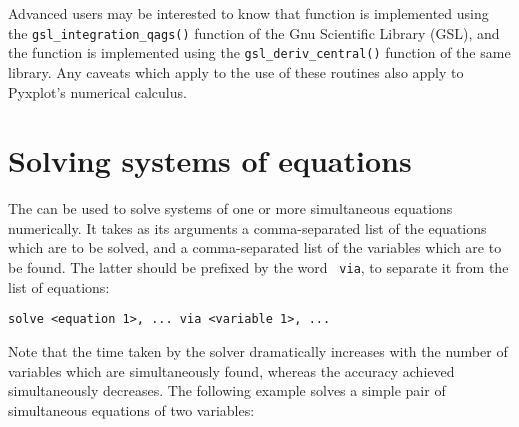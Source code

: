 Advanced users may be interested to know that  function is
implemented using the {\tt gsl\_\-integration\_\-qags()} function of the Gnu
Scientific Library (GSL), and the  function is
implemented using the {\tt gsl\_\-deriv\_\-central()} function of the same library.
Any caveats which apply to the use of these routines also apply to Pyxplot's
numerical calculus.


\section{Solving systems of equations}

The  can be used to solve systems of one or more simultaneous
equations numerically. It takes as its arguments a comma-separated list of the
equations which are to be solved, and a comma-separated list of the variables
which are to be found. The latter should be prefixed by the word {\tt
via}, to separate it from the list of equations:

\begin{verbatim}
solve <equation 1>, ... via <variable 1>, ...
\end{verbatim}

Note that the time taken by the solver dramatically increases with the number
of variables which are simultaneously found, whereas the accuracy achieved
simultaneously decreases. The following example solves a simple pair of
simultaneous equations of two variables:

